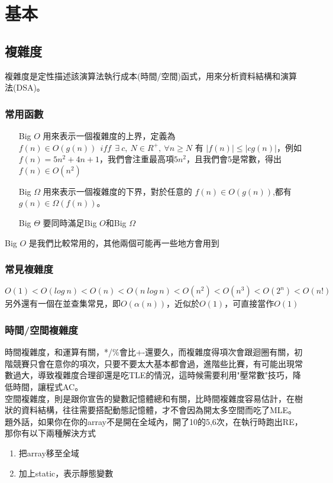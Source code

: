 \section{基本}
\subsection{複雜度}
複雜度是定性描述該演算法執行成本(時間/空間)函式，用來分析資料結構和演算法(DSA)。
\subsubsection{常用函數}
\begin{enumerate}
\item [Big $O$]
用來表示一個複雜度的上界，定義為$f(n)\in O(g(n))\ \ iff\ \ \exists\ c,\ N\in R^{+},\ \forall n \geq  N$ 有 $|f(n)| \leq |cg(n)|$，例如$f(n)=5n^2+4n+1$，我們會注重最高項$5n^2$，且我們會5是常數，得出$f(n)\in O(n^2)$
\item [Big $\Omega$]
用來表示一個複雜度的下界，對於任意的 $f(n) \in O(g(n))$,都有 $g(n) \in \Omega (f(n))$。
\item [Big $\Theta$]
要同時滿足Big $O$和Big $\Omega$
\end{enumerate}
Big $O$ 是我們比較常用的，其他兩個可能再一些地方會用到
    
\subsubsection{常見複雜度}
$O(1) < O(log\ n) < O(n) < O(n\ log\ n) < O(n^2) < O(n^3) < O(2^n) < O(n!)$
另外還有一個在並查集常見，即$O(\alpha(n))$，近似於$O(1)$，可直接當作$O(1)$
\subsubsection{時間/空間複雜度}
時間複雜度，和運算有關，*/\%會比+-還要久，而複雜度得項次會跟迴圈有關，初階競賽只會在意你的項次，只要不要太大基本都會過，進階些比賽，有可能出現常數過大，導致複雜度合理卻還是吃TLE的情況，這時候需要利用"壓常數"技巧，降低時間，讓程式AC。 \\  空間複雜度，則是跟你宣告的變數記憶體總和有關，比時間複雜度容易估計，在樹狀的資料結構，往往需要搭配動態記憶體，才不會因為開太多空間而吃了MLE。 \\  題外話，如果你在你的array不是開在全域內，開了10的5,6次，在執行時跑出RE，那你有以下兩種解決方式
\begin{enumerate}
\item 把array移至全域
\item 加上static，表示靜態變數
\end{enumerate}

